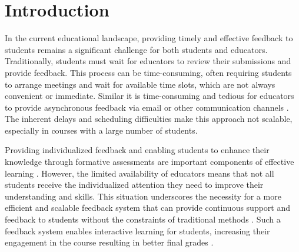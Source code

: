 \documentclass[sigconf,screen,review,anonymous]{acmart}
\begin{document}



\maketitle

\section{Introduction} %


In the current educational landscape, providing timely and effective feedback to students remains a significant challenge for both students and educators.
Traditionally, students must wait for educators to review their submissions and provide feedback.
This process can be time-consuming, often requiring students to arrange meetings and wait for available time slots, which are not always convenient or immediate.
Similar it is time-consuming and tedious for educators to provide asynchronous feedback via email or other communication channels \cite{henderson:2019:ChallengesFeedbackHigher}.
The inherent delays and scheduling difficulties make this approach not scalable, especially in courses with a large number of students.

Providing individualized feedback and enabling students to enhance their knowledge through formative assessments are important components of effective learning \cite{irons:2007:EnhancingLearningFormative,higgins:2002:ConscientiousConsumerReconsidering}.
However, the limited availability of educators means that not all students receive the individualized attention they need to improve their understanding and skills.
This situation underscores the necessity for a more efficient and scalable feedback system that can provide continuous support and feedback to students without the constraints of traditional methods \cite{sondergaard:2004:EffectiveFeedbackSmall}.
Such a feedback system enables interactive learning for students, increasing their engagement in the course resulting in better final grades \cite{krusche:2017:InteractiveLearningIncreasing}.
\end{document}
